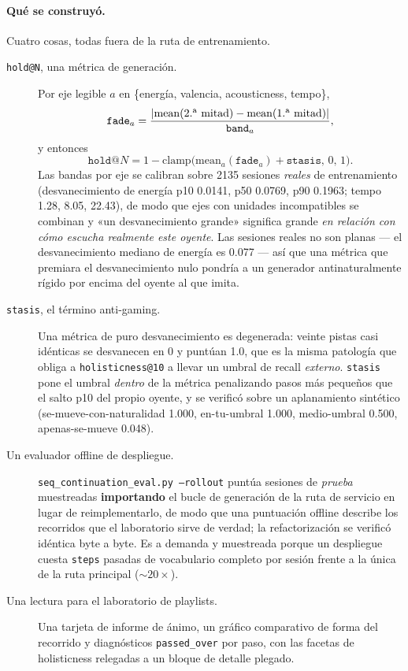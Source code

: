\documentclass[11pt]{article}
\begin{document}
\paragraph{Qué se construyó.} Cuatro cosas, todas fuera de la ruta de
entrenamiento.
\begin{description}
  \item[\texttt{hold@N}, una métrica de generación.] Por eje legible $a$ en
  \{energía, valencia, acousticness, tempo\},
  \[
    \texttt{fade}_a = \frac{|\mathrm{mean}(\text{2.\textsuperscript{a} mitad}) -
      \mathrm{mean}(\text{1.\textsuperscript{a} mitad})|}{\texttt{band}_a},
  \]
  y entonces
  \[
    \texttt{hold@}N = 1 - \mathrm{clamp}\bigl(\mathrm{mean}_a(\texttt{fade}_a)
      + \texttt{stasis},\,0,\,1\bigr).
  \]
  Las bandas por eje se calibran sobre \num{2135} sesiones \emph{reales} de
  entrenamiento (desvanecimiento de energía p10 \num{0.0141}, p50 \num{0.0769},
  p90 \num{0.1963}; tempo \num{1.28}, \num{8.05}, \num{22.43}), de modo que ejes
  con unidades incompatibles se combinan y «un desvanecimiento grande» significa
  grande \emph{en relación con cómo escucha realmente este oyente}. Las sesiones
  reales no son planas --- el desvanecimiento mediano de energía es \num{0.077} ---
  así que una métrica que premiara el desvanecimiento nulo pondría a un generador
  antinaturalmente rígido por encima del oyente al que imita.
  \item[\texttt{stasis}, el término anti-gaming.] Una métrica de puro
  desvanecimiento es degenerada: veinte pistas casi idénticas se desvanecen en
  \num{0} y puntúan \num{1.0}, que es la misma patología que obliga a
  \texttt{holisticness@10} a llevar un umbral de recall \emph{externo}.
  \texttt{stasis} pone el umbral \emph{dentro} de la métrica penalizando pasos más
  pequeños que el salto p10 del propio oyente, y se verificó sobre un aplanamiento
  sintético (se-mueve-con-naturalidad \num{1.000}, en-tu-umbral \num{1.000},
  medio-umbral \num{0.500}, apenas-se-mueve \num{0.048}).
  \item[Un evaluador offline de despliegue.] \texttt{seq\_continuation\_eval.py
  --rollout} puntúa sesiones de \emph{prueba} muestreadas \textbf{importando} el
  bucle de generación de la ruta de servicio en lugar de reimplementarlo, de modo
  que una puntuación offline describe los recorridos que el laboratorio sirve de
  verdad; la refactorización se verificó idéntica byte a byte. Es a demanda y
  muestreada porque un despliegue cuesta \texttt{steps} pasadas de vocabulario
  completo por sesión frente a la única de la ruta principal
  (${\sim}20\times$).
  \item[Una lectura para el laboratorio de playlists.] Una tarjeta de informe de
  ánimo, un gráfico comparativo de forma del recorrido y diagnósticos
  \texttt{passed\_over} por paso, con las facetas de holisticness relegadas a un
  bloque de detalle plegado.
\end{description}
\end{document}
